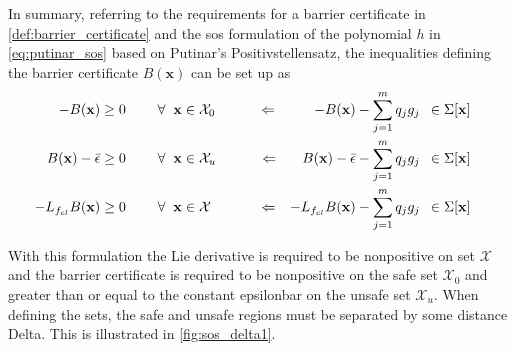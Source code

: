 \begin{defn}\label{def:barrier_sos}
In summary, referring to the requirements for a barrier certificate in \autoref{def:barrier_certificate} and the \gls{sos} formulation of the polynomial $h$ in \autoref{eq:putinar_sos} based on Putinar's Positivstellensatz, the inequalities defining the barrier certificate $B(\mathbf{x})$ can be set up as
\vspace{-2mm}
\begin{subequations}\label{eq:barrier_constraints_putinar}
\begin{flalign}
&&	-B(\mathbf{x}) &\geq 0 \hspace{0.8cm}  \forall \hspace{2mm} \mathbf{x} \in \mathcal{X}_0 \qquad\quad \Leftarrow& 	-B(\mathbf{x}) - \sum _{j=1}^{m}q_jg_j &\,\,\,\in \Sigma[\mathbf{x}] &&& \label{cer1_putinar}\\
&&	B(\mathbf{x})-\bar{\epsilon} &\geq 0 \hspace{0.8cm}  \forall \hspace{2mm} \mathbf{x} \in \mathcal{X}_u \qquad\quad \Leftarrow& 	B(\mathbf{x})-\bar{\epsilon} - \sum _{j=1}^{m}q_jg_j &\,\,\,\in \Sigma[\mathbf{x}] &&&\label{cer2_putinar} \\
&&	-L_{f_{cl}}B(\mathbf{x}) &\geq 0 \hspace{0.8cm}  \forall \hspace{2mm} \mathbf{x} \in \mathcal{X} \qquad\quad\,\, \Leftarrow& 	-L_{f_{cl}}B(\mathbf{x}) - \sum _{j=1}^{m}q_jg_j &\,\,\,\in \Sigma[\mathbf{x}] &&& \label{cer3_putinar}
\end{flalign}
\end{subequations}
\end{defn}

With this formulation the Lie derivative is required to be nonpositive on set $\mathcal{X}$ and the barrier certificate is required to be nonpositive on the safe set $\mathcal{X}_0$ and greater than or equal to the constant \gls{epsilonbar} on the unsafe set $\mathcal{X}_u$. When defining the sets, the safe and unsafe regions must be separated by some distance \gls{Delta}. This is illustrated in \autoref{fig:sos_delta1}.

